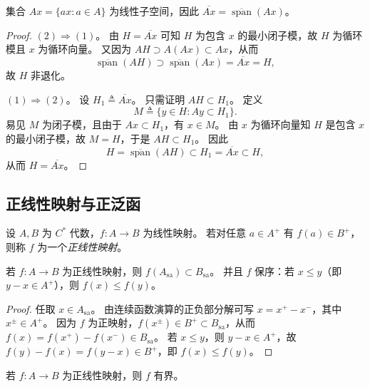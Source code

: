 \documentclass[lang=cn,a4paper,newtx,section]{elegantbook}
\begin{document}
\begin{remark}
  集合 $Ax=\{ax:a\in A\}$ 为线性子空间，因此 $\overline{Ax}=\overline{\operatorname{span}}(Ax)$。
\end{remark}

\begin{proof}
  $(2)\Rightarrow(1)$。
  由 $H=\overline{Ax}$ 可知 $H$ 为包含 $x$ 的最小闭子模，故 $H$ 为循环模且 $x$ 为循环向量。
  又因为 $AH\supset A(Ax)\subset Ax$，从而
  \[
    \overline{\operatorname{span}}(AH)\supset\overline{\operatorname{span}}(Ax)=\overline{Ax}=H,
  \]
  故 $H$ 非退化。

  $(1)\Rightarrow(2)$。
  设 $H_{1}\triangleq\overline{Ax}$。
  只需证明 $AH\subset H_{1}$。
  定义
  \[
    M\triangleq\{y\in H:Ay\subset H_{1}\}.
  \]
  易见 $M$ 为闭子模，且由于 $Ax\subset H_{1}$，有 $x\in M$。
  由 $x$ 为循环向量知 $H$ 是包含 $x$ 的最小闭子模，故 $M=H$，于是 $AH\subset H_{1}$。
  因此
  \[
    H=\overline{\operatorname{span}}(AH)\subset H_{1}=\overline{Ax}\subset H,
  \]
  从而 $H=\overline{Ax}$。
\end{proof}

\subsection{正线性映射与正泛函}

\begin{definition}
  设 $A,B$ 为 $C^{*}$ 代数，$f:A\to B$ 为线性映射。
  若对任意 $a\in A^{+}$ 有 $f(a)\in B^{+}$，则称 $f$ 为一个\emph{正线性映射}。
\end{definition}

\begin{proposition}\label{prop:pos-map-sa}
  若 $f:A\to B$ 为正线性映射，则 $f(A_{\mathrm{sa}})\subset B_{\mathrm{sa}}$。
  并且 $f$ 保序：若 $x\le y$（即 $y-x\in A^{+}$），则 $f(x)\le f(y)$。
\end{proposition}

\begin{proof}
  任取 $x\in A_{\mathrm{sa}}$。
  由连续函数演算的正负部分解可写 $x=x^{+}-x^{-}$，其中 $x^{\pm}\in A^{+}$。
  因为 $f$ 为正映射，$f(x^{\pm})\in B^{+}\subset B_{\mathrm{sa}}$，从而 $f(x)=f(x^{+})-f(x^{-})\in B_{\mathrm{sa}}$。
  若 $x\le y$，则 $y-x\in A^{+}$，故 $f(y)-f(x)=f(y-x)\in B^{+}$，即 $f(x)\le f(y)$。
\end{proof}

\begin{theorem}
  若 $f:A\to B$ 为正线性映射，则 $f$ 有界。
\end{theorem}
\end{document}
